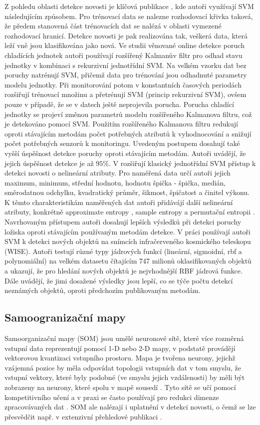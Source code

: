 \par 
Z pohledu oblasti detekce novosti je klíčová publikace \cite{svm5}, kde autoři využívají SVM následujícím způsobem. Pro trénovací data se nalezne rozhodovací křivka taková, že předem stanovená část trénovacích dat se nalézá v oblasti vymezené rozhodovací hranicí. Detekce novosti je pak realizována tak, veškerá data, která leží vně jsou klasifikována jako nová. Ve studii věnované online detekce poruch chladících jednotek \cite{svm6} autoři používají rozšířený Kalmanův filtr pro odhad stavu jednotky v kombinaci s rekurzivní jednotřídní SVM. Na velkém vzorku dat bez poruchy natrénují SVM, přičemž data pro trénování jsou odhadnuté parametry modelu jednotky. Při monitorování potom v konstantních časových periodách rozšiřují trénovací množinu a přetrénují SVM (princip rekurzivní SVM), ovšem pouze v případě, že se v datech ještě neprojevila porucha. Porucha chladící jednotky se projeví změnou parametrů modelu rozšířeného Kalmanova filtru, což je detekováno pomocí SVM. Použitím rozšířeného Kalmanova filtru redukují oproti stávajícím metodám počet potřebných atributů k vyhodnocování a snižují počet potřebných senzorů k monitoringu. Uvedeným postupem dosahují také vyšší úspěšnost detekce poruchy oproti stávajícím metodám. Autoři uvádějí, že jejich úspěšnost detekce je až $95\%$. V \cite{svm7} rozšiřují klasický jednotřídní SVM přístup k detekci novosti o nelineární atributy. Pro naměřená data určí autoři jejich maximum, minimum, střední hodnotu, hodnotu špička - špička, medián, směrodatnou odchylku, kvadratický průměr, šikmost, špičatost a činitel výkonu. K těmto charakteristikám naměřených dat autoři přidávájí další nelineární atributy, konkrétně approximate entropy \cite{ae}, sample entropy \cite{se} a permutační entropii \cite{pe}. Navrhovaným přístupem autoři dosahují lepších výsledků při detekci poruchy ložiska oproti stávajícím používaným metodám detekce. V práci \cite{svm8} používají autoři SVM k detekci nových objektů na snímcích infračerveného kosmického teleskopu (WISE). Autoři testují různé typy jádrových funkcí (lineární, sigmoidní, rbf a polynomiální) na velkém datasetu čítajícím 747 milionů oklasifikovaných objektů a ukazují, že pro hledání nových objektů je nejvhodnější RBF jádrová funkce. Dále uvádějí, že  jimi dosažené výsledky jsou lepší, co se týče počtu detekcí neznámých objektů, oproti předchozím publikovaným metodám. 
\subsection{Samoogranizační mapy}
Samoorganizační mapy (SOM) \cite{som0} jsou umělé neuronové sítě, které více rozměrná vstupní data reprezentují pomocí 1-D nebo 2-D mapy, v podstatě provádějí vektorovou kvantizaci vstupního prostoru. Mapa je tvořena neurony, jejichž vzájemná pozice by měla odpovídat topologii vstupních dat v tom smyslu, že vstupní vektory, které byly podobné (ve smyslu jejich vzdálenosti) by měli být zobrazeny na neurony, které spolu v mapě sousedí \cite{somS2}. Tyto sítě se učí pomocí kompetitivního učení a v praxi se často používají pro redukci dimenze zpracovávaných dat \cite{somS}. SOM ale nalézají i uplatnění v detekci novosti, o čemž se lze přesvědčit např. v extenzivní přehledové publikaci \cite{somS2}. 
